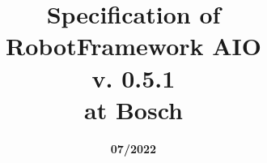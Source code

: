 
\title{\textbf{Specification of \\
\vspace{2ex}
RobotFramework AIO \\
\vspace{2ex}
v. 0.5.1 \\
\vspace{2ex}
at Bosch}}

\date{\vspace{4ex}\textbf{07/2022}}

